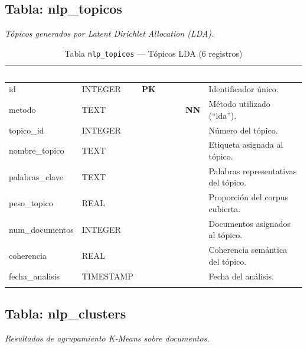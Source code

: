 \documentclass[11pt,a4paper]{article}
\newcommand{\tableheadrow}{\rowcolor{tableheader}}
\newcommand{\tablehead}[1]{\textcolor{white}{\textbf{#1}}}
\newcommand{\pk}{\textcolor{emiblue}{\textbf{PK}}}
\newcommand{\nn}{\textcolor{red!70!black}{\textbf{NN}}}
\begin{document}
\subsection{Tabla: nlp\_topicos}
\textit{Tópicos generados por Latent Dirichlet Allocation (LDA).}

\begin{longtable}{p{4.2cm} p{2.8cm} c c c p{4.5cm}}
\toprule
\tableheadrow
\tablehead{Campo} & \tablehead{Tipo} & \tablehead{PK} & \tablehead{FK} & \tablehead{NN} & \tablehead{Descripción} \\
\midrule
\endhead
id & INTEGER & \pk & & & Identificador único. \\
\rowcolor{tablerow}
metodo & TEXT & & & \nn & Método utilizado (``lda''). \\
topico\_id & INTEGER & & & & Número del tópico. \\
\rowcolor{tablerow}
nombre\_topico & TEXT & & & & Etiqueta asignada al tópico. \\
palabras\_clave & TEXT & & & & Palabras representativas del tópico. \\
\rowcolor{tablerow}
peso\_topico & REAL & & & & Proporción del corpus cubierta. \\
num\_documentos & INTEGER & & & & Documentos asignados al tópico. \\
\rowcolor{tablerow}
coherencia & REAL & & & & Coherencia semántica del tópico. \\
fecha\_analisis & TIMESTAMP & & & & Fecha del análisis. \\
\bottomrule
\caption{Tabla \texttt{nlp\_topicos} — Tópicos LDA (6 registros)}
\end{longtable}

\subsection{Tabla: nlp\_clusters}
\textit{Resultados de agrupamiento K-Means sobre documentos.}
\end{document}

